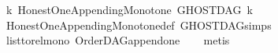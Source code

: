 \begin{isabellebody}
\ {\isachardoublequoteopen}{\isasymforall}k{\isachardot}{\kern0pt}\ Honest{\isacharunderscore}{\kern0pt}One{\isacharunderscore}{\kern0pt}Appending{\isacharunderscore}{\kern0pt}Monotone\ {\isacharparenleft}{\kern0pt}GHOSTDAG\ k{\isacharparenright}{\kern0pt}{\isachardoublequoteclose}\isanewline
%
\isadelimproof
\ \ %
\endisadelimproof
%
\isatagproof
{}\isamarkupfalse%
\ Honest{\isacharunderscore}{\kern0pt}One{\isacharunderscore}{\kern0pt}Appending{\isacharunderscore}{\kern0pt}Monotone{\isacharunderscore}{\kern0pt}def\ GHOSTDAG{\isachardot}{\kern0pt}simps\ \isanewline
\ \ \isamarkupfalse%
\ list{\isacharunderscore}{\kern0pt}to{\isacharunderscore}{\kern0pt}rel{\isacharunderscore}{\kern0pt}mono\ OrderDAG{\isacharunderscore}{\kern0pt}append{\isacharunderscore}{\kern0pt}one\isanewline
\ \ \isamarkupfalse%
\ metis%
\endisatagproof
{\isafoldproof}%
%
\isadelimproof
\isanewline
%
\endisadelimproof
%
\isadelimtheory
\isanewline
%
\endisadelimtheory
%
\isatagtheory
{}\isamarkupfalse%
%
\endisatagtheory
{\isafoldtheory}%
%
\isadelimtheory
%
\endisadelimtheory
%
\end{isabellebody}%
\endinput
